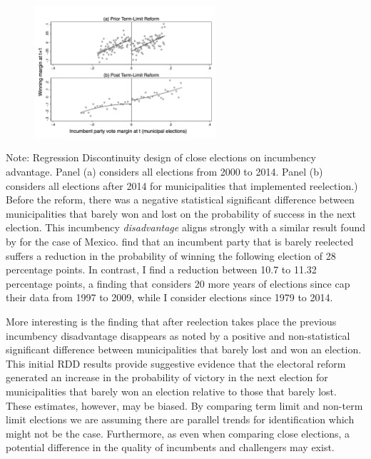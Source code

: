 \documentclass[12pt]{amsart}
\numberwithin{equation}{section}
\theoremstyle{definition}
\theoremstyle{definition}
\theoremstyle{definition}
\begin{document}
\begin{appendix}
\begin{figure}[H]
 \includegraphics[width=0.6\textwidth]{Figures_incumbency/RDD_incumbency_margin_pol2.png}
     \captionsetup{justification=centering}  
       
\end{figure} 
       Note: Regression Discontinuity design of close elections on incumbency advantage. Panel (a) considers all elections from 2000 to 2014. Panel (b) considers all elections after 2014 for municipalities that implemented reelection.) 
\\
       
Before the reform, there was a negative statistical significant difference between municipalities that barely won and lost on the probability of success in the next election. This incumbency \emph{disadvantage} aligns strongly with a similar result found by \citet{klasnja_titiunik_2017} for the case of Mexico. \citet{klasnja_titiunik_2017} find that an incumbent party that is barely reelected suffers a reduction in the probability of winning the following election of 28 percentage points. In contrast, I find a reduction between 10.7 to 11.32 percentage points, a finding that considers 20 more years of elections since \citet{klasnja_titiunik_2017} cap their data from 1997 to 2009, while I consider elections since 1979 to 2014. 

More interesting is the finding that after reelection takes place the previous incumbency disadvantage disappears as noted by a positive and non-statistical significant difference between municipalities that barely lost and won an election. This initial RDD results provide suggestive evidence that the electoral reform generated an increase in the probability of victory in the next election for municipalities that barely won an election relative to those that barely lost. These estimates, however, may be biased. By comparing term limit and non-term limit elections we are assuming there are parallel trends for identification which might not be the case. Furthermore, as \citet{eggers_2017} even when comparing close elections, a potential difference in the quality of incumbents and challengers may exist. 
 

\end{appendix}
\end{document}
